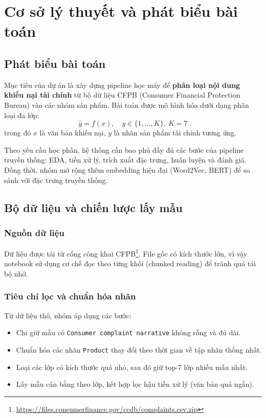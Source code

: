 \section{Cơ sở lý thuyết và phát biểu bài toán}

\subsection{Phát biểu bài toán}
Mục tiêu của dự án là xây dựng pipeline học máy để \textbf{phân loại nội dung khiếu nại tài chính} từ bộ dữ liệu CFPB (Consumer Financial Protection Bureau) vào các nhóm sản phẩm. Bài toán được mô hình hóa dưới dạng phân loại đa lớp:
\begin{equation}
\hat{y} = f(x), \quad y \in \{1,\ldots,K\}, \ K=7
\end{equation}
trong đó $x$ là văn bản khiếu nại, $y$ là nhãn sản phẩm tài chính tương ứng.

Theo yêu cầu học phần, hệ thống cần bao phủ đầy đủ các bước của pipeline truyền thống: EDA, tiền xử lý, trích xuất đặc trưng, huấn luyện và đánh giá. Đồng thời, nhóm mở rộng thêm embedding hiện đại (Word2Vec, BERT) để so sánh với đặc trưng truyền thống.

\subsection{Bộ dữ liệu và chiến lược lấy mẫu}
\subsubsection{Nguồn dữ liệu}
Dữ liệu được tải từ cổng công khai CFPB\footnote{\url{https://files.consumerfinance.gov/ccdb/complaints.csv.zip}}. File gốc có kích thước lớn, vì vậy notebook sử dụng cơ chế đọc theo từng khối (chunked reading) để tránh quá tải bộ nhớ.

\subsubsection{Tiêu chí lọc và chuẩn hóa nhãn}
Từ dữ liệu thô, nhóm áp dụng các bước:
\begin{itemize}[nosep]
    \item Chỉ giữ mẫu có \texttt{Consumer complaint narrative} không rỗng và đủ dài.
    \item Chuẩn hóa các nhãn \texttt{Product} thay đổi theo thời gian về tập nhãn thống nhất.
    \item Loại các lớp có kích thước quá nhỏ, sau đó giữ top-7 lớp nhiều mẫu nhất.
    \item Lấy mẫu cân bằng theo lớp, kết hợp lọc hậu tiền xử lý (văn bản quá ngắn).
\end{itemize}

